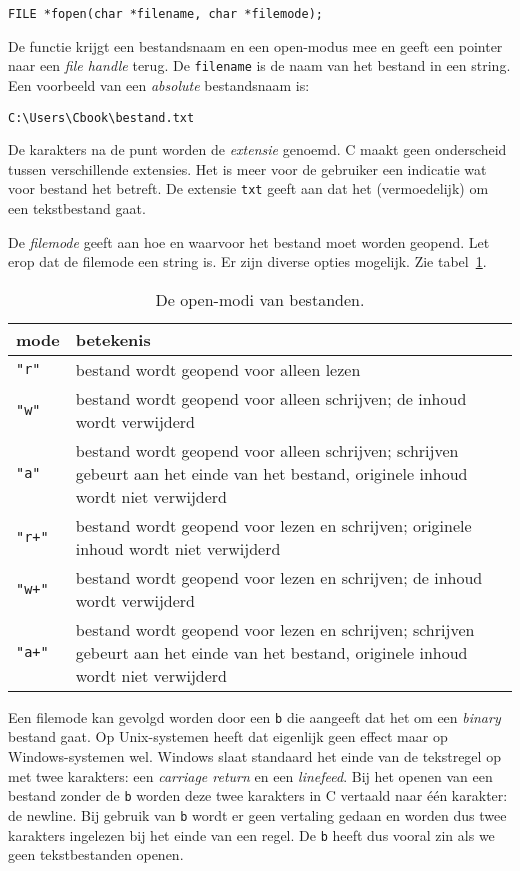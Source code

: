 \hspace*{1em}\texttt{FILE *fopen(char *filename, char *filemode);}

De functie krijgt een bestandsnaam en een open-modus mee en geeft een pointer naar een \textsl{file handle} terug.
De \texttt{filename} is de naam van het bestand in een string. Een voorbeeld van een \textsl{absolute} bestandsnaam is:

\hspace*{1em}\texttt{C:\textbackslash Users\textbackslash Cbook\textbackslash bestand.txt}

De karakters na de punt worden de \textsl{extensie} genoemd. C maakt geen onderscheid tussen verschillende extensies. Het is meer voor de gebruiker een indicatie wat voor bestand het betreft. De extensie \texttt{txt} geeft aan dat het (vermoedelijk) om een tekstbestand gaat.

De \textsl{filemode} geeft aan hoe en waarvoor het bestand moet worden geopend. Let erop dat de filemode een string is. Er zijn diverse opties mogelijk. Zie tabel~\ref{tab:invopenmodes}.

\begin{table}[!ht]
\centering
\caption{De open-modi van bestanden.}
\label{tab:invopenmodes}
\begin{tabular}{lp{13cm}}
mode & betekenis \\
\midrule
\texttt{"r"} & bestand wordt geopend voor alleen lezen \\
\texttt{"w"} & bestand wordt geopend voor alleen schrijven; de inhoud wordt verwijderd \\
\texttt{"{}a"} & bestand wordt geopend voor alleen schrijven; schrijven gebeurt aan het einde van het bestand, originele inhoud wordt niet verwijderd \\
\texttt{"r+"} & bestand wordt geopend voor lezen en schrijven; originele inhoud wordt niet verwijderd\\
\texttt{"w+"} & bestand wordt geopend voor lezen en schrijven; de inhoud wordt verwijderd \\
\texttt{"{}a+"} & bestand wordt geopend voor lezen en schrijven; schrijven gebeurt aan het einde van het bestand, originele inhoud wordt niet verwijderd \\
\bottomrule
\end{tabular}
\end{table}

Een filemode kan gevolgd worden door een \texttt{b} die aangeeft dat het om een \textsl{binary} bestand gaat. Op Unix-systemen heeft dat eigenlijk geen effect maar op Windows-systemen wel. Windows slaat standaard het einde van de tekstregel op met twee karakters: een \textsl{carriage return} en een \textsl{linefeed}. Bij het openen van een bestand zonder de \texttt{b} worden deze twee karakters in C vertaald naar één karakter: de newline. Bij gebruik van \texttt{b} wordt er geen vertaling gedaan en worden dus twee karakters ingelezen bij het einde van een regel. De \texttt{b} heeft dus vooral zin als we geen tekstbestanden openen.

